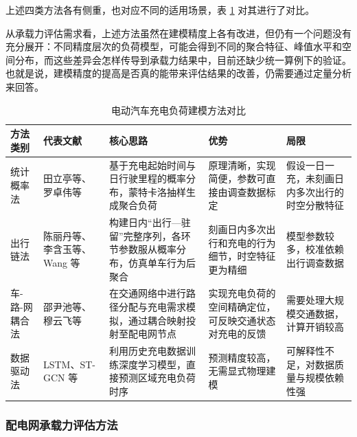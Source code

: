 \documentclass[10pt,a4paper]{article}
\numberwithin{equation}{section}
\numberwithin{table}{section}
\numberwithin{figure}{section}
\begin{document}
    上述四类方法各有侧重，也对应不同的适用场景，表 \ref{tab:model_compare} 对其进行了对比。

    从承载力评估需求看，上述方法虽然在建模精度上各有改进，但仍有一个问题没有充分展开：不同精度层次的负荷模型，可能会得到不同的聚合特征、峰值水平和空间分布，而这些差异会怎样传导到承载力结果中，目前还缺少统一算例下的验证。也就是说，建模精度的提高是否真的能带来评估结果的改善，仍需要通过定量分析来回答。

    \begin{table}[htbp]
        \centering
        \caption{电动汽车充电负荷建模方法对比}
        \label{tab:model_compare}
        \setlength{\tabcolsep}{3pt}
        \renewcommand{\arraystretch}{1.35}
        \begin{tabularx}{\textwidth}{>{\centering\arraybackslash}p{1.8cm} >{\centering\arraybackslash}p{2.6cm} >{\raggedright\arraybackslash}X >{\raggedright\arraybackslash}X >{\raggedright\arraybackslash}X}
            \toprule
            方法类别 & 代表文献 & 核心思路 & 优势 & 局限 \\
            \midrule
            统计概率法 & 田立亭等\supercite{ref7}、罗卓伟等\supercite{ref8} & 基于充电起始时间与日行驶里程的概率分布，蒙特卡洛抽样生成聚合负荷 & 原理清晰，实现简便，参数可直接由调查数据标定 & 假设一日一充，未刻画日内多次出行的时空分散特征 \\
            出行链法 & 陈丽丹等\supercite{ref9}、李含玉等\supercite{ref10}、Wang 等\supercite{ref11} & 构建日内“出行—驻留”完整序列，各环节参数服从概率分布，仿真单车行为后聚合 & 刻画日内多次出行和充电的行为细节，时空特征更为精细 & 模型参数较多，校准依赖出行调查数据 \\
            车-路-网耦合法 & 邵尹池等\supercite{ref4}、穆云飞等\supercite{ref12} & 在交通网络中进行路径分配与充电需求模拟，通过耦合映射投射至配电网节点 & 实现充电负荷的空间精确定位，可反映交通状态对充电的反馈 & 需要处理大规模交通数据，计算开销较高 \\
            数据驱动法 & LSTM、ST-GCN 等 & 利用历史充电数据训练深度学习模型，直接预测区域充电负荷时序 & 预测精度较高，无需显式物理建模 & 可解释性不足，对数据质量与规模依赖性强 \\
            \bottomrule
        \end{tabularx}
    \end{table}

    \subsubsection{配电网承载力评估方法}
\end{document}
